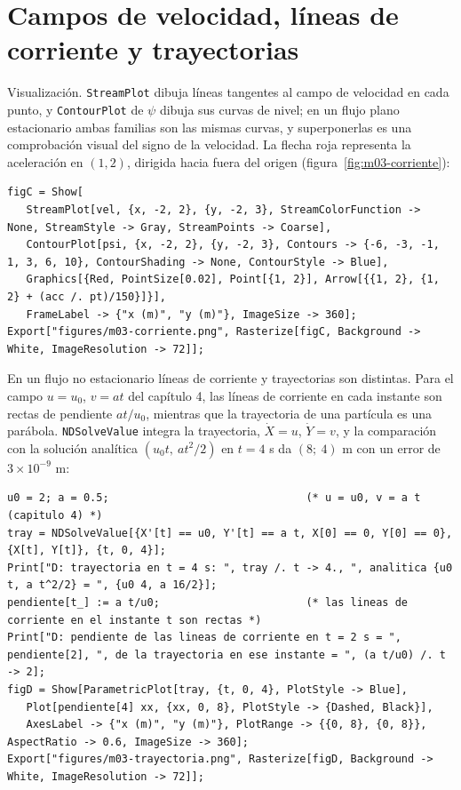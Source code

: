 \documentclass[10pt,openany]{book}
\begin{document}
\section{Campos de velocidad, líneas de corriente y trayectorias}

Visualización. \texttt{StreamPlot} dibuja líneas tangentes al campo de velocidad en cada punto, y \texttt{ContourPlot} de \(\psi\) dibuja sus curvas de nivel; en un flujo plano estacionario ambas familias son las mismas curvas, y superponerlas es una comprobación visual del signo de la velocidad. La flecha roja representa la aceleración en \((1, 2)\), dirigida hacia fuera del origen (figura~\ref{fig:m03-corriente}):
\begin{lstlisting}[style=studium]
figC = Show[
   StreamPlot[vel, {x, -2, 2}, {y, -2, 3}, StreamColorFunction -> None, StreamStyle -> Gray, StreamPoints -> Coarse],
   ContourPlot[psi, {x, -2, 2}, {y, -2, 3}, Contours -> {-6, -3, -1, 1, 3, 6, 10}, ContourShading -> None, ContourStyle -> Blue],
   Graphics[{Red, PointSize[0.02], Point[{1, 2}], Arrow[{{1, 2}, {1, 2} + (acc /. pt)/150}]}],
   FrameLabel -> {"x (m)", "y (m)"}, ImageSize -> 360];
Export["figures/m03-corriente.png", Rasterize[figC, Background -> White, ImageResolution -> 72]];
\end{lstlisting}
En un flujo no estacionario líneas de corriente y trayectorias son distintas. Para el campo \(u = u_0\), \(v = a t\) del capítulo 4, las líneas de corriente en cada instante son rectas de pendiente \(a t/u_0\), mientras que la trayectoria de una partícula es una parábola. \texttt{NDSolveValue} integra la trayectoria, \(\dot X = u\), \(\dot Y = v\), y la comparación con la solución analítica \((u_0 t,\ a t^{2}/2)\) en \(t = 4\) s da \((8;\ 4)\) m con un error de \(3\times 10^{-9}\) m:
\begin{lstlisting}[style=studium]
u0 = 2; a = 0.5;                               (* u = u0, v = a t (capitulo 4) *)
tray = NDSolveValue[{X'[t] == u0, Y'[t] == a t, X[0] == 0, Y[0] == 0}, {X[t], Y[t]}, {t, 0, 4}];
Print["D: trayectoria en t = 4 s: ", tray /. t -> 4., ", analitica {u0 t, a t^2/2} = ", {u0 4, a 16/2}];
pendiente[t_] := a t/u0;                       (* las lineas de corriente en el instante t son rectas *)
Print["D: pendiente de las lineas de corriente en t = 2 s = ", pendiente[2], ", de la trayectoria en ese instante = ", (a t/u0) /. t -> 2];
figD = Show[ParametricPlot[tray, {t, 0, 4}, PlotStyle -> Blue],
   Plot[pendiente[4] xx, {xx, 0, 8}, PlotStyle -> {Dashed, Black}],
   AxesLabel -> {"x (m)", "y (m)"}, PlotRange -> {{0, 8}, {0, 8}}, AspectRatio -> 0.6, ImageSize -> 360];
Export["figures/m03-trayectoria.png", Rasterize[figD, Background -> White, ImageResolution -> 72]];
\end{lstlisting}
\end{document}
